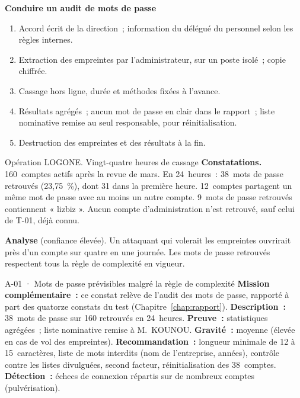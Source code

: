 \begin{boxprocedure}
\textbf{Conduire un audit de mots de passe}
\begin{enumerate}
    \item Accord écrit de la direction~; information du délégué du personnel
          selon les règles internes.
    \item Extraction des empreintes par l'administrateur, sur un poste isolé~;
          copie chiffrée.
    \item Cassage hors ligne, durée et méthodes fixées à l'avance.
    \item Résultats agrégés~; aucun mot de passe en clair dans le rapport~;
          liste nominative remise au seul responsable, pour réinitialisation.
    \item Destruction des empreintes et des résultats à la fin.
\end{enumerate}
\end{boxprocedure}

\begin{boxscenario}{Opération LOGONE. Vingt-quatre heures de cassage}
\textbf{Constatations.} 160~comptes actifs après la revue de mars. En
24~heures~: 38~mots de passe retrouvés (23,75~\%), dont 31 dans la
première heure. 12~comptes partagent un même mot de passe avec au moins un
autre compte. 9~mots de passe retrouvés contiennent « lizbiz ». Aucun compte
d'administration n'est retrouvé, sauf celui de T-01, déjà connu.

\medskip
\textbf{Analyse} (confiance élevée). Un attaquant qui volerait les
empreintes ouvrirait près d'un compte sur quatre en une journée. Les
mots de passe retrouvés respectent tous la règle de complexité en vigueur.
\end{boxscenario}

\begin{boxobjet}{A-01 · Mots de passe prévisibles malgré la règle de complexité}
\textbf{Mission complémentaire~:} ce constat relève de l'audit des mots de
passe, rapporté à part des quatorze constats du test (Chapitre~\ref{chap:rapport}).
\textbf{Description~:} 38~mots de passe sur 160 retrouvés en 24~heures.
\textbf{Preuve~:} statistiques agrégées~; liste nominative remise à
M.~KOUNOU. \textbf{Gravité~:} moyenne (élevée en cas de vol des empreintes).
\textbf{Recommandation~:} longueur minimale de 12 à 15~caractères, liste de
mots interdits (nom de l'entreprise, années), contrôle contre les listes
divulguées, second facteur, réinitialisation des 38~comptes.
\textbf{Détection~:} échecs de connexion répartis sur de nombreux comptes
(pulvérisation).
\end{boxobjet}

